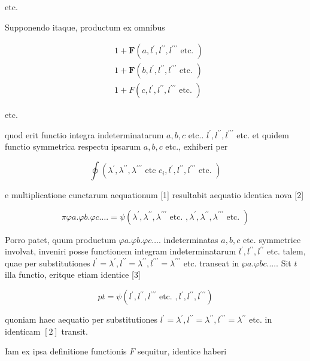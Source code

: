 \documentclass[twoside,12pt, showframe]{memoir}
\begin{document}
etc.

Supponendo itaque, productum ex omnibus

\[
\begin{aligned}
& 1+\boldsymbol{F}\left(a, l^{\prime}, l^{\prime \prime}, l^{\prime \prime \prime} \text { etc. }\right) \\
& 1+\boldsymbol{F}\left(b, l^{\prime}, l^{\prime \prime}, l^{\prime \prime \prime} \text { etc. }\right) \\
& 1+F\left(c, l^{\prime}, l^{\prime \prime}, l^{\prime \prime \prime} \text { etc. }\right)
\end{aligned}
\]

etc.

quod erit functio integra indeterminatarum \(a, b, c\) etc.. \(l^{\prime}, l^{\prime \prime}, l^{\prime \prime \prime}\) etc. et quidem functio symmetrica respectu ipsarum \(a, b, c\) etc., exhiberi per

\[
\oint\left(\lambda^{\prime}, \lambda^{\prime \prime}, \lambda^{\prime \prime \prime} \text { etc } c_{i}, l^{\prime}, l^{\prime \prime}, l^{\prime \prime \prime} \text { etc. }\right)
\]

e multiplicatione cunctarum aequationum [1] resultabit aequatio identica nova [2]

\[
\pi \varphi a . \varphi b . \varphi c \ldots .=\psi\left(\lambda^{\prime}, \lambda^{\prime \prime}, \lambda^{\prime \prime \prime} \text { etc. }, \lambda^{\prime}, \lambda^{\prime \prime}, \lambda^{\prime \prime \prime} \text { etc. }\right)
\]

Porro patet, quum productum \(\varphi a . \varphi b . \varphi c \ldots\). indeterminatas \(a, b, c\) etc. symmetrice involvat, inveniri posse functionem integram indeterminatarum \(l^{\prime}, l^{\prime \prime}, l^{\prime \prime}\) etc. talem, quae per substitutiones \(l^{\prime}=\lambda^{\prime}, l^{\prime \prime}=\lambda^{\prime \prime}, l^{\prime \prime \prime}=\lambda^{\prime \prime \prime}\) etc. transeat in \(\wp a . \varphi b c . . \ldots\) Sit \(t\) illa functio, eritque etiam identice [3]

\[
p t=\psi\left(l^{\prime}, l^{\prime \prime}, l^{\prime \prime \prime} \text { etc. }, l^{\prime}, l^{\prime \prime}, l^{\prime \prime \prime}\right)
\]

quoniam haec aequatio per substitutiones \(l^{\prime}=\lambda^{\prime}, l^{\prime \prime}=\lambda^{\prime \prime}, l^{\prime \prime \prime}=\lambda^{\prime \prime}\) etc. in identicam \([2]\) transit.

Iam ex ipsa definitione functionis \(F\) sequitur, identice haberi
\end{document}
